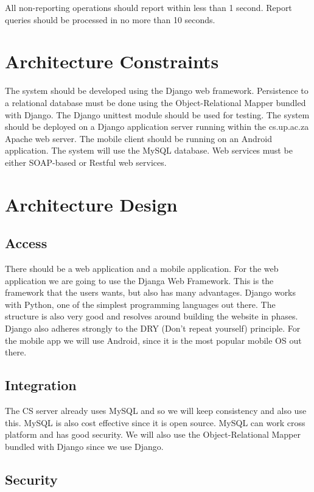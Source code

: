 \documentclass[a4paper]{article}
\begin{document}
All non-reporting operations should report within less than 1 second. Report queries should be processed in no more than 10 seconds.

\section{Architecture Constraints}
	
The system should be developed using the Django web framework. Persistence to a relational database must be done using the Object-Relational Mapper bundled with Django. The Django unittest module should be used for testing. The system should be deployed on a Django application server running within the cs.up.ac.za Apache web server. The mobile client should be running on an Android application. The system will use the MySQL database. Web services must be either SOAP-based or Restful web services.

\section{Architecture Design}

\subsection{Access}

There should be a web application and a mobile application. For the web application we are going to use the Djanga Web Framework. This is the framework that the users wants, but also has many advantages. Django works with Python, one of the simplest programming languages out there. The structure is also very good and resolves around building the website in phases. Django also adheres strongly to the DRY (Don't repeat yourself) principle. For the mobile app we will use Android, since it is the most popular mobile OS out there.

\subsection{Integration}

The CS server already uses MySQL and so we will keep consistency and also use this. MySQL is also cost effective since it is open source. MySQL can work cross platform and has good security. We will also use the Object-Relational Mapper bundled with Django since we use Django.

\subsection{Security}
\end{document}
